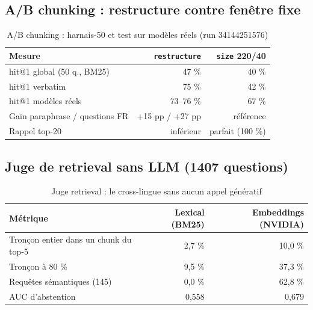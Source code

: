 \documentclass[a4paper,12pt]{report}
\begin{document}
\subsection{A/B chunking : restructure contre fen\^etre fixe}
\begin{table}[H]
\centering
\begin{tabular}{|l|r|r|}
\hline
Mesure & \texttt{restructure} & \texttt{size} 220/40 \\
\hline
hit@1 global (50 q., BM25) & 47 \% & 40 \% \\
\hline
hit@1 verbatim & 75 \% & 42 \% \\
\hline
hit@1 mod\`eles r\'eels & 73--76 \% & 67 \% \\
\hline
Gain paraphrase / questions FR & +15 pp / +27 pp & r\'ef\'erence \\
\hline
Rappel top-20 & inf\'erieur & parfait (100 \%) \\
\hline
\end{tabular}
\caption{A/B chunking : harnais-50 et test sur mod\`eles r\'eels (run 34144251576)}
\end{table}

\subsection{Juge de retrieval sans LLM (1407 questions)}
\begin{table}[H]
\centering
\begin{tabular}{|l|r|r|}
\hline
M\'etrique & Lexical (BM25) & Embeddings (NVIDIA) \\
\hline
Tron\c{c}on entier dans un chunk du top-5 & 2,7 \% & 10,0 \% \\
\hline
Tron\c{c}on \`a 80 \% & 9,5 \% & 37,3 \% \\
\hline
Requ\^etes s\'emantiques (145) & 0,0 \% & 62,8 \% \\
\hline
AUC d'abstention & 0,558 & 0,679 \\
\hline
\end{tabular}
\caption{Juge retrieval : le cross-lingue sans aucun appel g\'en\'eratif}
\end{table}
\end{document}
